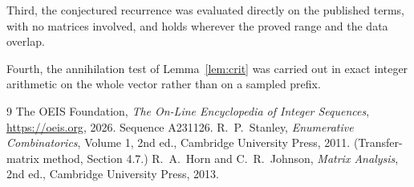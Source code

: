 \documentclass[11pt,a4paper]{article}
\theoremstyle{plain}
\theoremstyle{definition}
\begin{document}
Third, the conjectured recurrence was evaluated directly on the published terms, with no
matrices involved, and holds wherever the proved range and the data overlap.

Fourth, the annihilation test of Lemma~\ref{lem:crit} was carried out in exact integer
arithmetic on the whole vector rather than on a sampled prefix.

\begin{thebibliography}{9}
 The OEIS Foundation, \emph{The On-Line Encyclopedia of Integer
Sequences}, \url{https://oeis.org}, 2026. Sequence A231126.
 R.~P.~Stanley, \emph{Enumerative Combinatorics}, Volume 1, 2nd ed.,
Cambridge University Press, 2011. (Transfer-matrix method, Section 4.7.)
 R.~A.~Horn and C.~R.~Johnson, \emph{Matrix Analysis}, 2nd ed., Cambridge
University Press, 2013.
\end{thebibliography}
\end{document}
